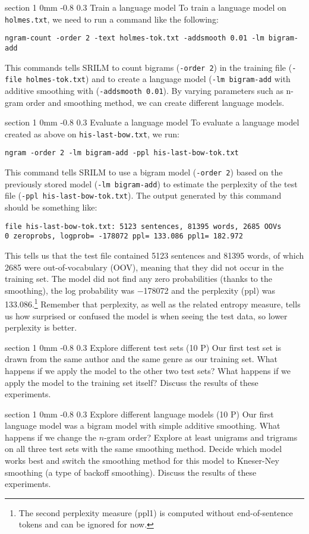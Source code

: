 \documentclass[11pt]{article}
\makeatletter
\newcommand{\newsec}[2]{\section{#1}\label{sec:#2}\noindent}
\renewcommand{\section}{\@startsection
{section}%
{1}%
{0mm}%
{-0.8\baselineskip}%
{0.3\baselineskip}%
{\bfseries\large}}%
\makeatother
\begin{document}
\newsec{Train a language model}{train}%
To train a language model on {\tt holmes.txt}, we need to run a command like the following:
\begin{verbatim}
ngram-count -order 2 -text holmes-tok.txt -addsmooth 0.01 -lm bigram-add
\end{verbatim}
This commands tells SRILM to count bigrams ({\tt -order\,2}) in the training file ({\tt -file\,holmes-tok.txt})
and to create a language model ({\tt -lm\,bigram-add} with additive smoothing with ({\tt -addsmooth\,0.01}).
By varying parameters such as n-gram order and smoothing method, we can create different language models.

\newsec{Evaluate a language model}{eval}%
To evaluate a language model created as above on {\tt his-last-bow.txt}, we run:
\begin{verbatim}
ngram -order 2 -lm bigram-add -ppl his-last-bow-tok.txt
\end{verbatim}
This command tells SRILM to use a bigram model ({\tt -order\,2}) based on the previously stored model ({\tt -lm\,bigram-add}) 
to estimate the perplexity of the test file ({\tt -ppl\,his-last-bow-tok.txt}). The output generated by this command should be
something like:
\begin{verbatim}
file his-last-bow-tok.txt: 5123 sentences, 81395 words, 2685 OOVs
0 zeroprobs, logprob= -178072 ppl= 133.086 ppl1= 182.972
\end{verbatim}
This tells us that the test file contained 5123 sentences and 81395 words, of which 2685 were out-of-vocabulary (OOV),
meaning that they did not occur in the training set. The model did not find any zero probabilities (thanks to the smoothing),
the log probability was $-$178072 and the perplexity (ppl) was 133.086.\footnote{The second perplexity measure (ppl1)
is computed without end-of-sentence tokens and can be ignored for now.} Remember that perplexity, as well as the related
entropy measure, tells us how surprised or confused the model is when seeing the test data, so lower perplexity is better.

\newsec{Explore different test sets (10 P)}{sets}%
Our first test set is drawn from the same author and the same genre as
our training set. What happens if we apply the model to the other two
test sets? What happens if we apply the model to the training set
itself? Discuss the results of these experiments.

\newsec{Explore different language models (10 P)}{models}%
Our first language model was a bigram model with simple additive
smoothing. What happens if we change the $n$-gram order?  Explore at
least unigrams and trigrams on all three test sets with the same
smoothing method. Decide which model works best and switch the
smoothing method for this model to Kneser-Ney smoothing (a type of
backoff smoothing). Discuss the results of these experiments.
\end{document}
